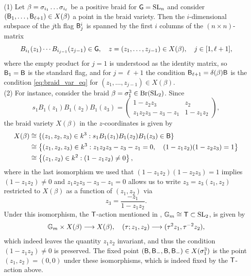 \begin{example}\label{ex:braid_matrices} (1) Let $\beta=\sigma_{i_1}\ldots \sigma_{i_\ell}$ be a positive braid for $\mathsf{G}=\operatorname{SL}_n$ and consider $(\mathsf{B}_1,\ldots,\mathsf{B}_{\ell+1})\in X(\beta)$ a point in the braid variety. Then the $i$-dimensional subspace of the $j$th flag $\mathsf{B}_j^i$ is spanned by the first $i$ columns of the $(n\times n)$-matrix
$$B_{i_{1}}(z_1)\cdots B_{i_{j-1}}(z_{j-1}) \in \mathsf{G}, \quad z=(z_1,\ldots,z_{j-1})\in X(\beta),\quad j\in[1,\ell+1],$$
\noindent where the empty product for $j=1$ is understood as the identity matrix, so $\mathsf{B}_1=\mathsf{B}$ is the standard flag, and for $j=\ell+1$ the condition $\mathsf{B}_{\ell+1}=\delta(\beta)\mathsf{B}$ is the condition \cref{eq:braid_var_eq} for $(z_1,\ldots,z_{j-1})\in X(\beta)$.\\

\noindent (2) For instance, consider the braid $\beta=\sigma_1^3\in\text{Br}(\operatorname{SL}_2)$. Since
$$s_1B_1(z_1)B_1(z_2)B_1(z_3)=\begin{pmatrix}
1-z_2z_3 & z_2\\
z_1z_2z_3-z_3-z_1 & 1-z_1z_2
\end{pmatrix},$$
the braid variety $X(\beta)$ in the $z$-coordinates is given by
\begin{align*}
X(\beta) & \cong \{(z_1,z_2,z_3)\in k^3:s_1B_1(z_1)B_1(z_2)B_1(z_3)\in\mathsf{B}\}\\
         & \cong \left\{(z_1,z_2,z_3)\in k^3:z_1z_2z_3-z_3-z_1=0,\quad (1-z_1z_2)(1-z_2z_3)=1\right\}\\
         & \cong \left\{(z_1,z_2)\in k^2:(1-z_1z_2)\neq0\right\},
\end{align*}
where in the last isomorphism we used that $(1-z_1z_2)(1-z_2z_3)=1$ implies $(1-z_1z_2)\neq0$ and $z_1z_2z_3-z_3-z_1=0$ allows us to write $z_3=z_3(z_1,z_2)$ restricted to $X(\beta)$ as a function of $(z_1,z_2)$ via
$$z_3=\frac{-z_1}{1-z_1z_2}.$$
Under this isomorphism, the $\mathsf{T}$-action mentioned in , $\mathbb{G}_m\cong\mathsf{T}\subset\operatorname{SL}_2$, is given by
$$\mathbb{G}_m\times X(\beta)\longrightarrow X(\beta),\quad (\tau;z_1,z_2)\longrightarrow (\tau^2 z_1,\tau^{-2}z_2),$$
which indeed leaves the quantity $z_1z_2$ invariant, and thus the condition $(1-z_1z_2)\neq0$ is preserved. The fixed point $(\mathsf{B},\mathsf{B}_-,\mathsf{B},\mathsf{B}_-)\in X(\sigma_1^3)$ is the point $(z_1,z_2)=(0,0)$ under these isomorphisms, which is indeed fixed by the $\mathsf{T}$-action above.\\


\end{example}

